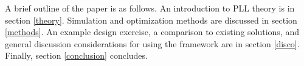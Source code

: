 A brief outline of the paper is as follows. An introduction to PLL theory is in section \ref{theory}. Simulation and optimization methods are discussed in section \ref{methods}. An example design exercise, a comparison to existing solutions, and general discussion considerations for using the framework are in section \ref{disco}. Finally, section \ref{conclusion} concludes.

